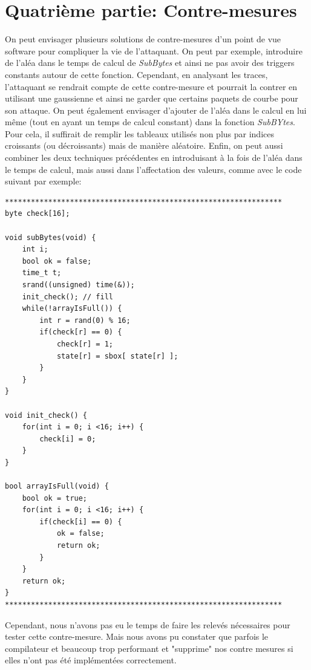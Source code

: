 \documentclass[a4paper, 12pt]{article}
\begin{document}
\section{Quatrième partie: Contre-mesures}
	On peut envisager plusieurs solutions de contre-mesures d'un point de vue software pour compliquer la vie de l'attaquant. 
	On peut par exemple, introduire de l'aléa dans le temps de calcul de \emph{SubBytes} et ainsi ne pas avoir des triggers constants autour de cette fonction. Cependant, en analysant les traces, l'attaquant se rendrait compte de cette contre-mesure et pourrait la contrer en utilisant une gaussienne et ainsi ne garder que certains paquets de courbe pour son attaque. 
	On peut également envisager d'ajouter de l'aléa dans le calcul en lui même (tout en ayant un temps de calcul constant) dans la fonction \emph{SubBYtes}. Pour cela, il suffirait de remplir les tableaux utilisés non plus par indices croissants (ou décroissants) mais de manière aléatoire. 
	Enfin, on peut aussi combiner les deux techniques précédentes en introduisant à la fois de l'aléa dans le temps de calcul, mais aussi dans l'affectation des valeurs, comme avec le code suivant par exemple:
\begin{lstlisting}
****************************************************************
byte check[16];

void subBytes(void) {
	int i;
	bool ok = false;
	time_t t;
	srand((unsigned) time(&));
	init_check(); // fill
	while(!arrayIsFull()) {
		int r = rand(0) % 16;
		if(check[r] == 0) {
			check[r] = 1;
			state[r] = sbox[ state[r] ];
		}
	}
}

void init_check() {
	for(int i = 0; i <16; i++) {
		check[i] = 0;
	}
}

bool arrayIsFull(void) {
	bool ok = true;
	for(int i = 0; i <16; i++) {
		if(check[i] == 0) {
			ok = false;
			return ok;
		}
	}
	return ok;
}
****************************************************************
\end{lstlisting}
Cependant, nous n'avons pas eu le temps de faire les relevés nécessaires pour tester cette contre-mesure. Mais nous avons pu constater que parfois le compilateur et beaucoup trop performant et "supprime" nos contre mesures si elles n'ont pas été implémentées correctement. 

\newpage
\end{document}
